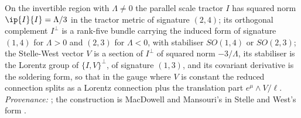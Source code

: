 On the invertible region with $\Lambda \neq 0$ the parallel scale tractor $I$ has squared norm $\ip{I}{I} = \Lambda/3$ in the tractor metric of signature $(2,4)$; its orthogonal complement $I^{\perp}$ is a rank-five bundle carrying the induced form of signature $(1,4)$ for $\Lambda > 0$ and $(2,3)$ for $\Lambda < 0$, with stabiliser $SO(1,4)$ or $SO(2,3)$; the Stelle-West vector $V$ is a section of $I^{\perp}$ of squared norm $-3/\Lambda$, its stabiliser is the Lorentz group of $\{I, V\}^{\perp}$, of signature $(1,3)$, and its covariant derivative is the soldering form, so that in the gauge where $V$ is constant the reduced connection splits as a Lorentz connection plus the translation part $e^{\mu}\wedge V/\ell$. \emph{Provenance:} \cite[Fact~2.1, Thm.~3.1]{ButlerT10}; the construction is MacDowell and Mansouri's \cite{MacDowellMansouri1977} in Stelle and West's form \cite{StelleWest1980}.
